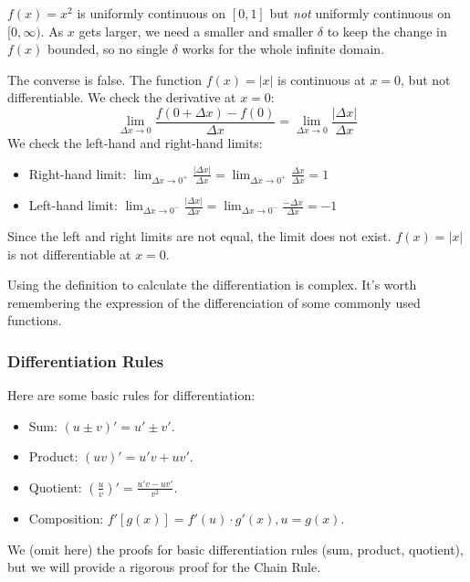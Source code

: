 \documentclass[oneside]{book}
\begin{document}
\begin{example}
$f(x) = x^2$ is uniformly continuous on $[0, 1]$ but \emph{not} uniformly continuous on $[0, \infty)$. As $x$ gets larger, we need a smaller and smaller $\delta$ to keep the change in $f(x)$ bounded, so no single $\delta$ works for the whole infinite domain.
\end{example}

\begin{example}
The converse is false. The function $f(x) = |x|$ is continuous at $x=0$, but not differentiable.
We check the derivative at $x=0$:
\[
\lim_{\Delta x \to 0} \frac{f(0 + \Delta x) - f(0)}{\Delta x} = \lim_{\Delta x \to 0} \frac{|\Delta x|}{\Delta x}
\]
We check the left-hand and right-hand limits:
\begin{itemize}
    \item Right-hand limit: $\lim_{\Delta x \to 0^+} \frac{|\Delta x|}{\Delta x} = \lim_{\Delta x \to 0^+} \frac{\Delta x}{\Delta x} = 1$
    \item Left-hand limit: $\lim_{\Delta x \to 0^-} \frac{|\Delta x|}{\Delta x} = \lim_{\Delta x \to 0^-} \frac{-\Delta x}{\Delta x} = -1$
\end{itemize}
Since the left and right limits are not equal, the limit does not exist. $f(x) = |x|$ is not differentiable at $x=0$.
\end{example}

Using the definition to calculate the differentiation is complex. It's worth remembering the expression of the differenciation of some commonly used functions.

\subsubsection{Differentiation Rules}

Here are some basic rules for differentiation:
\begin{itemize}
    \item Sum: $(u\pm v)'=u'\pm v'$.
    \item Product: $(uv)'=u'v+uv'$.
    \item Quotient: $(\frac{u}{v})'=\frac{u'v-uv'}{v^2}$.
    \item Composition: $f'[g(x)]=f'(u) \cdot g'(x), u = g(x)$.
\end{itemize}

\newpage

We (omit here) the proofs for basic differentiation rules (sum, product, quotient), but we will provide a rigorous proof for the Chain Rule.
\end{document}
